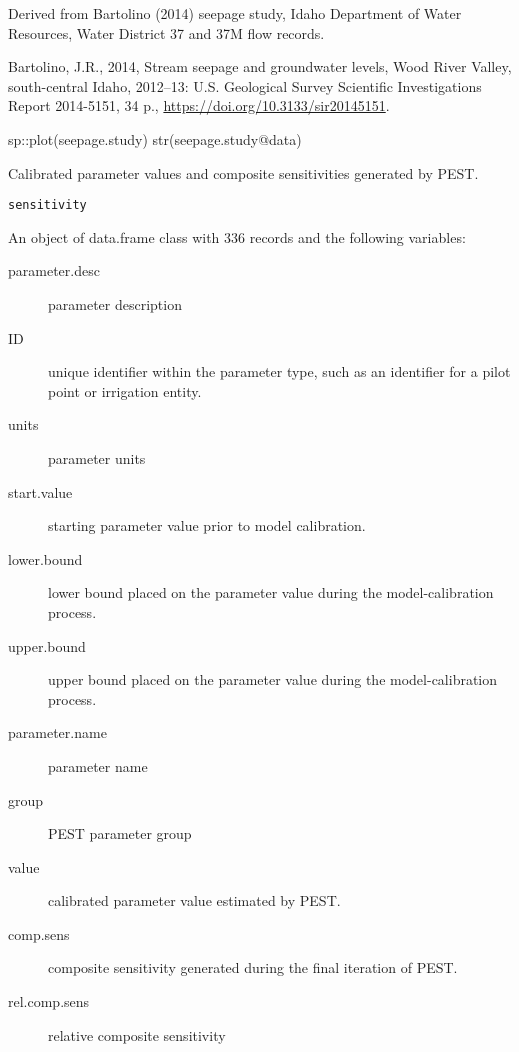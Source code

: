 \documentclass[a4paper]{book}
\begin{document}
%
\begin{Source}\relax
Derived from Bartolino (2014) seepage study,
Idaho Department of Water Resources, Water District 37 and 37M flow records.
\end{Source}
%
\begin{References}\relax
Bartolino, J.R., 2014, Stream seepage and groundwater levels, Wood River Valley,
south-central Idaho, 2012--13: U.S. Geological Survey Scientific Investigations Report 2014-5151,
34 p., \url{https://doi.org/10.3133/sir20145151}.
\end{References}
%
\begin{Examples}
\begin{ExampleCode}
sp::plot(seepage.study)
str(seepage.study@data)

\end{ExampleCode}
\end{Examples}
%
\begin{Description}\relax
Calibrated parameter values and composite sensitivities generated by PEST.
\end{Description}
%
\begin{Usage}
\begin{verbatim}
sensitivity
\end{verbatim}
\end{Usage}
%
\begin{Format}
An object of data.frame class with 336 records and the following variables:
\begin{description}

\item[parameter.desc] parameter description
\item[ID] unique identifier within the parameter type,
such as an identifier for a pilot point or irrigation entity.
\item[units] parameter units
\item[start.value] starting parameter value prior to model calibration.
\item[lower.bound] lower bound placed on the parameter value
during the model-calibration process.
\item[upper.bound] upper bound placed on the parameter value
during the model-calibration process.
\item[parameter.name]  parameter name
\item[group] PEST parameter group
\item[value] calibrated parameter value estimated by PEST.
\item[comp.sens] composite sensitivity generated during the final iteration of PEST.
\item[rel.comp.sens] relative composite sensitivity

\end{description}

\end{Format}
\end{document}
